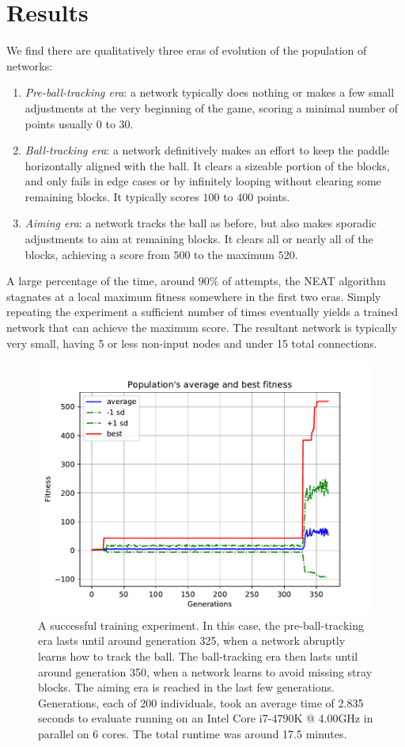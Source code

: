 \documentclass[letterpaper, twocolumn]{article}
\begin{document}
\section{Results}
We find there are qualitatively three eras of evolution of the population of
networks:
\begin{enumerate}
    \item{}\emph{Pre-ball-tracking era}: a network typically does nothing or makes a few small adjustments at the very beginning of the game, scoring a minimal number of points usually $0$ to $30$.
    \item{}\emph{Ball-tracking era}: a network definitively makes an effort to keep the paddle horizontally aligned with the ball. 
	    It clears a sizeable portion of the blocks, and only fails in edge cases or by infinitely looping without clearing some remaining blocks. 
		It typically scores $100$ to $400$ points.
    \item{}\emph{Aiming era}: a network tracks the ball as before, but also makes sporadic adjustments to aim at remaining blocks. 
	    It clears all or nearly all of the blocks, achieving a score from
		$500$ to the maximum $520$.
\end{enumerate}
A large percentage of the time, around $90\%$ of attempts, the NEAT algorithm stagnates at a local maximum
fitness somewhere in the first two eras.
Simply repeating the experiment a sufficient number of times eventually yields a trained network that
can achieve the maximum score.
The resultant network is typically very small, having 5 or less non-input nodes and under 15 total connections.
\begin{figure}[ht!]
    \centering
    \includegraphics[width=.54 \textwidth]{avg_fitness.pdf}
    \caption{A successful training experiment. In this case, the pre-ball-tracking era lasts
        until around generation 325, when a network abruptly learns how to track the ball.
        The ball-tracking era then lasts until around generation 350, when a
	network learns to avoid missing stray blocks. 
	The aiming era is reached in the last few generations.
        Generations, each of 200 individuals, took an average time of 2.835 seconds to evaluate running on an
        Intel Core i7-4790K @ 4.00GHz in parallel on 6 cores. The total runtime was around 17.5 minutes.}
\end{figure}
\end{document}
